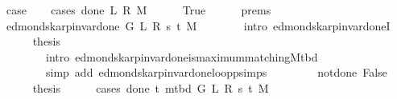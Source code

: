 \begin{isabellebody}
\ {\isacharquery}{\kern0pt}case\isanewline
\ \ \isamarkupfalse%
\ {\isacharparenleft}{\kern0pt}cases\ {\isachardoublequoteopen}done{\isacharunderscore}{\kern0pt}{}\ L\ R\ M{\isachardoublequoteclose}{\isacharparenright}{\kern0pt}\isanewline
\ \ \ \ \isamarkupfalse%
\ True\isanewline
\ \ \ \ \isamarkupfalse%
\ {\isachardoublequoteopen}{}{\isachardot}{\kern0pt}prems{\isachardoublequoteclose}\isanewline
\ \ \ \ \isamarkupfalse%
\ {\isachardoublequoteopen}edmonds{\isacharunderscore}{\kern0pt}karp{\isacharunderscore}{\kern0pt}invar{\isacharunderscore}{\kern0pt}done{\isacharunderscore}{\kern0pt}{}{\isacharprime}{\kern0pt}\ G\ L\ R\ s\ t\ M{\isachardoublequoteclose}\isanewline
\ \ \ \ \ \ \isamarkupfalse%
\ {\isacharparenleft}{\kern0pt}intro\ edmonds{\isacharunderscore}{\kern0pt}karp{\isacharunderscore}{\kern0pt}invar{\isacharunderscore}{\kern0pt}done{\isacharunderscore}{\kern0pt}{}I{\isacharparenright}{\kern0pt}\isanewline
\ \ \ \ \isamarkupfalse%
\ {\isacharquery}{\kern0pt}thesis\isanewline
\ \ \ \ \ \ \isamarkupfalse%
\isanewline
\ \ \ \ \ \ \ \ {\isacharparenleft}{\kern0pt}intro\ edmonds{\isacharunderscore}{\kern0pt}karp{\isacharunderscore}{\kern0pt}invar{\isacharunderscore}{\kern0pt}done{\isacharunderscore}{\kern0pt}{}{\isachardot}{\kern0pt}is{\isacharunderscore}{\kern0pt}maximum{\isacharunderscore}{\kern0pt}matching{\isacharunderscore}{\kern0pt}M{\isacharunderscore}{\kern0pt}tbd{\isacharparenright}{\kern0pt}\isanewline
\ \ \ \ \ \ \ \ {\isacharparenleft}{\kern0pt}simp\ add{\isacharcolon}{\kern0pt}\ edmonds{\isacharunderscore}{\kern0pt}karp{\isacharunderscore}{\kern0pt}invar{\isacharunderscore}{\kern0pt}done{\isacharunderscore}{\kern0pt}{}{\isachardot}{\kern0pt}loop{\isacharprime}{\kern0pt}{\isacharunderscore}{\kern0pt}psimps{\isacharparenright}{\kern0pt}\isanewline
\ \ \isamarkupfalse%
\isanewline
\ \ \ \ \isamarkupfalse%
\ not{\isacharunderscore}{\kern0pt}done{\isacharunderscore}{\kern0pt}{}{\isacharcolon}{\kern0pt}\ False\isanewline
\ \ \ \ \isamarkupfalse%
\ {\isacharquery}{\kern0pt}thesis\isanewline
\ \ \ \ \isamarkupfalse%
\ {\isacharparenleft}{\kern0pt}cases\ {\isachardoublequoteopen}done{\isacharunderscore}{\kern0pt}{}\ t\ {\isacharparenleft}{\kern0pt}m{\isacharunderscore}{\kern0pt}tbd\ G\ L\ R\ s\ t\ M{\isacharparenright}{\kern0pt}{\isachardoublequoteclose}{\isacharparenright}{\kern0pt}\isanewline

\end{isabellebody}
